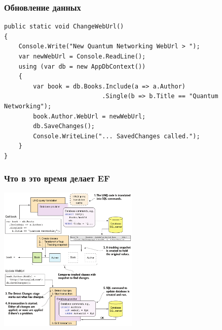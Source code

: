 \documentclass{../../slides-style}
\begin{document}
    \begin{frame}[fragile]
        \frametitle{Обновление данных}
        \begin{footnotesize}
            \begin{verbatim}
public static void ChangeWebUrl()
{
    Console.Write("New Quantum Networking WebUrl > ");
    var newWebUrl = Console.ReadLine();
    using (var db = new AppDbContext())
    {
        var book = db.Books.Include(a => a.Author)
                           .Single(b => b.Title == "Quantum Networking");
        book.Author.WebUrl = newWebUrl;
        db.SaveChanges();
        Console.WriteLine("... SavedChanges called.");
    }
}
            \end{verbatim}
        \end{footnotesize}
    \end{frame}

    \begin{frame}
        \frametitle{Что в это время делает EF}
        \begin{center}
            \includegraphics[width=0.5\textwidth]{efCoreUpdate.png}
        \end{center}
    \end{frame}
\end{document}
